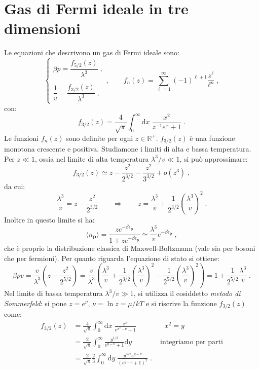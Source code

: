 \documentclass[10pt,a4paper]{report}
\theoremstyle{definition}
\numberwithin{equation}{section}
\newcommand{\diff}[1][]{\mathrm{d}#1}
\newcommand{\bra}{\langle}
\newcommand{\ket}{\rangle}
\begin{document}
\section{Gas di Fermi ideale in tre dimensioni}
Le equazioni che descrivono un gas di Fermi ideale sono:
\begin{equation}
\begin{cases}
\beta p=\dfrac{f_{5/2}(z)}{\lambda^3}\;, \\
\\
\dfrac{1}{v}=\dfrac{f_{3/2}(z)}{\lambda^3}\;,
\end{cases},\qquad f_n(z)=\sum_{\ell=1}^{\infty}(-1)^{\ell+1}\frac{z^{\ell}}{\ell^n}\;,
\end{equation}
con:
$$
f_{3/2}(z)=\frac{4}{\sqrt{\pi}}\int_0^{\infty}\diff{x}\;\frac{x^2}{z^{-1}e^x+1}\;.
$$
Le funzioni $f_n(z)$ sono definite per ogni $z\in\mathbb{R}^+$. $f_{3/2}(z)$ è una funzione monotona crescente e positiva. Studiamone i limiti di alta e bassa temperatura. \\
Per $z\ll 1$, ossia nel limite di alta temperatura $\lambda^3/v\ll 1$, si può approssimare:
$$
f_{3/2}(z)\simeq z-\frac{z^2}{2^{3/2}}-\frac{z^2}{3^{3/2}}+o(z^3)\;,
$$
da cui:
$$
\frac{\lambda^3}{v}=z-\frac{z^2}{2^{3/2}}\qquad \Longrightarrow\qquad z=\frac{\lambda^3}{v}+\frac{1}{2^{3/2}}\left(\frac{\lambda^3}{v}\right)^2\;.
$$
Inoltre in questo limite si ha:
\begin{equation}
\bra n_{\mathbf{p}}\ket=\frac{ze^{-\beta\epsilon_{\mathbf{p}}}}{1\mp ze^{-\beta\epsilon_{\mathbf{p}}}}\simeq \frac{\lambda^3}{v}e^{-\beta\epsilon_{\mathbf{p}}}\;,
\end{equation}
che è proprio la distribuzione classica di Maxwell-Boltzmann (vale sia per bosoni che per fermioni). Per quanto riguarda l'equazione di stato si ottiene:
\begin{equation}
\beta p v=\frac{v}{\lambda^3}\left(z-\frac{z^2}{2^{5/2}}\right)=\frac{v}{\lambda^3}\left(\frac{\lambda^3}{v}+\frac{1}{2^{3/2}}\left(\frac{\lambda^3}{v}\right)^2-\frac{1}{2^{5/2}}\left(\frac{\lambda^3}{v}\right)^2\right)=1+\frac{1}{2^{5/2}}\frac{\lambda^3}{v}\;.
\end{equation}
Nel limite di bassa temperatura $\lambda^3/v\gg 1$, si utilizza il cosiddetto \emph{metodo di Sommerfeld}: si pone $z=e^{\nu}$, $\nu=\ln z=\mu/kT$ e si riscrive la funzione $f_{3/2}(z)$ come:
\begin{align*}
f_{3/2}(z) &= \frac{4}{\sqrt{\pi}}\int_0^{\infty}\diff{x}\;\frac{x^2}{e^{x^2-\nu}+1}\qquad \qquad x^2=y \\
&=\frac{2}{\sqrt{\pi}}\int_0^{\infty}\frac{y^{1/2}}{e^{y-\nu}+1}\diff{y} \qquad \qquad \mbox{integriamo per parti} \\
&= \frac{2}{\sqrt{\pi}}\frac{2}{3}\int_0^{\infty}\diff{y}\; \frac{y^{3/2}e^{y-\nu}}{(e^{y-\nu}+1)^2}\;.
\end{align*}
\end{document}
